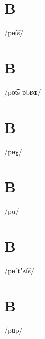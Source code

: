 \documentclass[10pt,a4paper,twoside]{book}
\begin{document}
\section*{B}

\begin{multicols}{3}
 {/pɵt͡s/} {}
\end{multicols}

\section*{B}

\begin{multicols}{3}
 {/pɵt͡sˈɒbʁɶ/} {}
\end{multicols}

\section*{B}

\begin{multicols}{3}
 {/pɵɣ/} {}
\end{multicols}

\section*{B}

\begin{multicols}{3}
 {/pu/} {}
\end{multicols}

\section*{B}

\begin{multicols}{3}
 {/pʉˈtʼʌt͡s/} {}
\end{multicols}

\section*{B}

\begin{multicols}{3}
 {/pʉp/} {}
\end{multicols}
\end{document}
